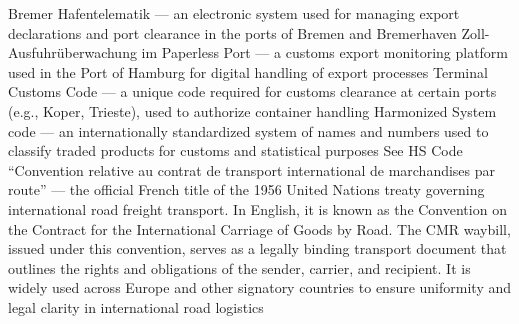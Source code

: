 
 {Bremer Hafentelematik — an electronic system used for managing export declarations and port clearance in the ports of Bremen and Bremerhaven}
 {Zoll-Ausfuhrüberwachung im Paperless Port — a customs export monitoring platform used in the Port of Hamburg for digital handling of export processes}
 {Terminal Customs Code — a unique code required for customs clearance at certain ports (e.g., Koper, Trieste), used to authorize container handling}
 {Harmonized System code — an internationally standardized system of names and numbers used to classify traded products for customs and statistical purposes}
 {See HS Code}
 {``Convention relative au contrat de transport international de marchandises par route'' — the official French title of the 1956 United Nations treaty governing international road freight transport. In English, it is known as the Convention on the Contract for the International Carriage of Goods by Road. The CMR waybill, issued under this convention, serves as a legally binding transport document that outlines the rights and obligations of the sender, carrier, and recipient. It is widely used across Europe and other signatory countries to ensure uniformity and legal clarity in international road logistics}




